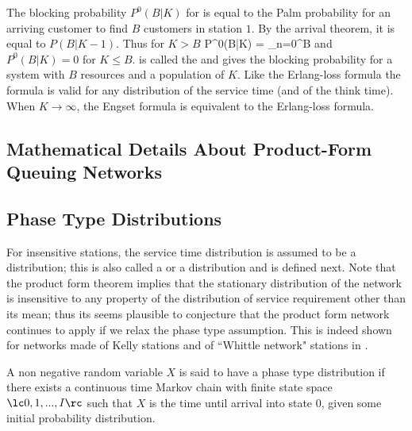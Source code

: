 The blocking probability $P^0(B|K)$ for is equal
to the Palm probability for an arriving customer
to find $B$ customers in station $1$. By the
arrival theorem, it is equal to $P(B|K-1)$. Thus
for $K > B$
  \be
  P^0(B|K) = 
  {\sum_{n=0}^{B} }
  \label{eq-q-qnet-engset}
  \ee
 and $P^0(B|K)=0$ for $K\leq B$.
 is called the  and gives the blocking probability for a
system with $B$ resources and a population of
$K$. Like the Erlang-loss formula the formula is
valid for any distribution of the service time
(and of the think time). When $K\to \infty$, the
Engset formula is equivalent to the Erlang-loss
formula.


\begin{petit}
\section{Mathematical Details About Product-Form Queuing
Networks}
 \label{sec-q-form-def}

\subsection{Phase Type Distributions}
\label{sec-q-ph}
For insensitive stations, the
service time distribution is assumed to be a  distribution; this is also called a  or a
 distribution and is defined next.
Note that the product form theorem implies that the stationary
distribution of the network is insensitive to any property of the distribution
of service requirement other than its mean; thus its seems plausible to conjecture that the product form network continues to apply if we relax the phase type assumption. This is indeed shown for networks made of Kelly stations and of ``Whittle network" stations in \cite{barbour1976networks}.

A non negative random variable $X$ is
said to have a phase type distribution if there
exists a continuous time Markov chain with finite
state space $\lc 0,1, ..., I \rc$ such that $X$
is the time until arrival into state $0$, given
some initial probability distribution.


\end{petit}
